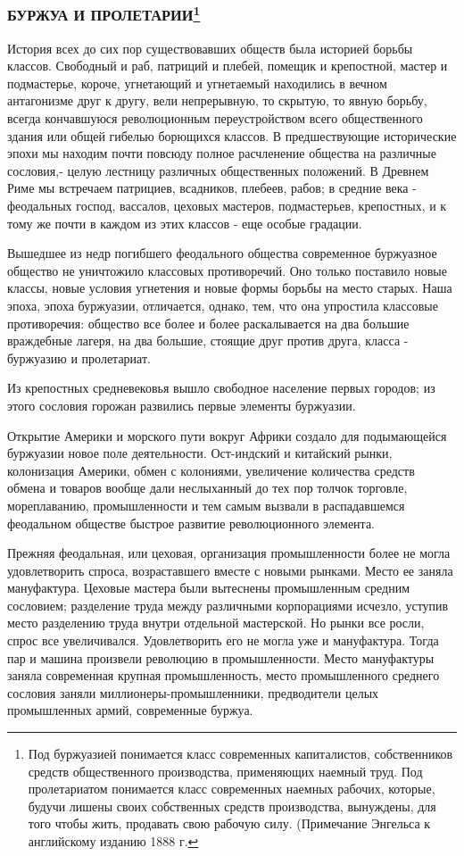 \documentclass[12pt]{article}
\newcommand{\parnum}{(\arabic{parcount})}
\newcounter{parcount}
\newenvironment{parnumbers}{%
  \par%
  \everypar{\noindent \stepcounter{parcount}\marginpar[]{\parnum}}%
}{}
\begin{document}
\subsubsection*{БУРЖУА И ПРОЛЕТАРИИ\footnote{Под буржуазией понимается класс современных капиталистов, собственников средств общественного производства, применяющих наемный труд. Под пролетариатом понимается класс современных наемных рабочих, которые, будучи лишены своих собственных средств производства, вынуждены, для того чтобы жить, продавать свою рабочую силу. (Примечание Энгельса к английскому изданию 1888 г.}}
\begin{parnumbers}
    История всех до сих пор существовавших обществ была историей борьбы классов. Свободный и раб, патриций и плебей, помещик и крепостной, мастер и подмастерье, короче, угнетающий и угнетаемый находились в вечном антагонизме друг к другу, вели непрерывную, то скрытую, то явную борьбу, всегда кончавшуюся революционным переустройством всего общественного здания или общей гибелью борющихся классов. В предшествующие исторические эпохи мы находим почти повсюду полное расчленение общества на различные сословия,- целую лестницу различных общественных положений. В Древнем Риме мы встречаем патрициев, всадников, плебеев, рабов; в средние века - феодальных господ, вассалов, цеховых мастеров, подмастерьев, крепостных, и к тому же почти в каждом из этих классов - еще особые градации.

    Вышедшее из недр погибшего феодального общества современное буржуазное общество не уничтожило классовых противоречий. Оно только поставило новые классы, новые условия угнетения и новые формы борьбы на место старых. Наша эпоха, эпоха буржуазии, отличается, однако, тем, что она упростила классовые противоречия: общество все более и более раскалывается на два большие враждебные лагеря, на два большие, стоящие друг против друга, класса - буржуазию и пролетариат.

    Из крепостных средневековья вышло свободное население первых городов; из этого сословия горожан развились первые элементы буржуазии.

    Открытие Америки и морского пути вокруг Африки создало для подымающейся буржуазии новое поле деятельности. Ост-индский и китайский рынки, колонизация Америки, обмен с колониями, увеличение количества средств обмена и товаров вообще дали неслыханный до тех пор толчок торговле, мореплаванию, промышленности и тем самым вызвали в распадавшемся феодальном обществе быстрое развитие революционного элемента.

    Прежняя феодальная, или цеховая, организация промышленности более не могла удовлетворить спроса, возраставшего вместе с новыми рынками. Место ее заняла мануфактура. Цеховые мастера были вытеснены промышленным средним сословием; разделение труда между различными корпорациями исчезло, уступив место разделению труда внутри отдельной мастерской. Но рынки все росли, спрос все увеличивался. Удовлетворить его не могла уже и мануфактура. Тогда пар и машина произвели революцию в промышленности. Место мануфактуры заняла современная крупная промышленность, место промышленного среднего сословия заняли миллионеры-промышленники, предводители целых промышленных армий, современные буржуа.


\end{parnumbers}
\end{document}
